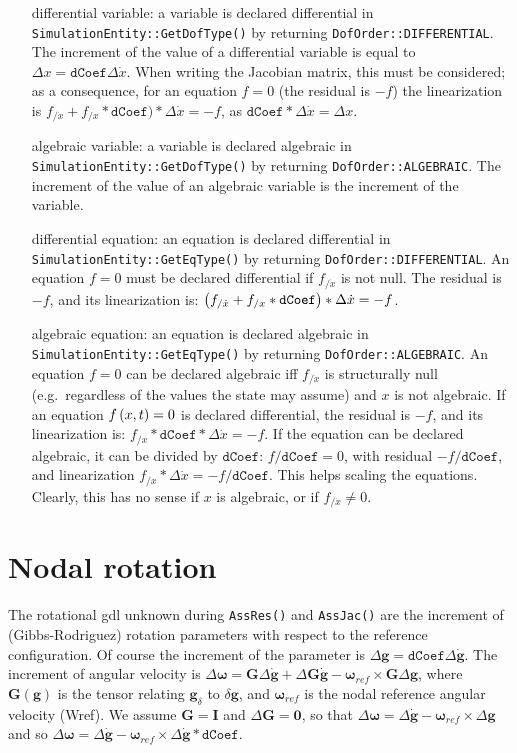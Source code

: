 \documentclass[10pt,dvips,fleqn]{report}
\newcommand{\T}[1]{\boldsymbol{#1}}
\begin{document}
\begin{itemize}

\item[differential variable:] a variable is declared differential
in \texttt{SimulationEntity::GetDofType()} 
by returning \texttt{DofOrder::DIFFERENTIAL}.
The increment of the value of a differential variable is equal 
to $\Delta x=\texttt{dCoef}\Delta \dot{x}$.
When writing the Jacobian matrix, this must be considered;
as a consequence, for an equation $f=0$ (the residual is $-f$)
the linearization is 
$f_{/\dot{x}}+f_{/x}*\texttt{dCoef})*\Delta \dot{x}=-f$, 
as $\texttt{dCoef}*\Delta \dot{x}=\Delta x$.

\item[algebraic variable:] a variable is declared algebraic
in \texttt{SimulationEntity::GetDofType()}
by returning \texttt{DofOrder::ALGEBRAIC}.
The increment of the value of an algebraic variable is the increment 
of the variable.

\item[differential equation:] an equation is declared differential
in \texttt{SimulationEntity::GetEqType()}
by returning \texttt{DofOrder::DIFFERENTIAL}.
An equation $f=0$ must be declared differential if $f_{/\dot{x}}$ is not null.
The residual is $-f$, and its linearization is:
$\left( f_{/\dot{x}}+f_{/x}*\texttt{dCoef} \right)*\Delta \dot{x}=-f$.

\item[algebraic equation:] an equation is declared algebraic
in \texttt{SimulationEntity::GetEqType()}
by returning \texttt{DofOrder::ALGEBRAIC}.
An equation $f=0$ can be declared algebraic iff $f_{/\dot{x}}$ 
is structurally null (e.g.\ regardless of the values the state may assume) 
and $x$ is not algebraic.
If an equation $f\left( x,t \right)=0$ is declared differential,
the residual is $-f$, and its linearization is:
$f_{/x}*\texttt{dCoef}*\Delta \dot{x}=-f$.
If the equation can be declared algebraic, it can be divided by $\texttt{dCoef}$:
$f/\texttt{dCoef}=0$, with residual $-f/\texttt{dCoef}$,
and linearization $f_{/x}*\Delta \dot{x} = -f/\texttt{dCoef}$.
This helps scaling the equations.
Clearly, this has no sense if $x$ is algebraic,
or if $f_{/\dot{x}} \neq 0$.

\end{itemize}

\section{Nodal rotation}
The rotational gdl unknown during \texttt{AssRes()} and \texttt{AssJac()}
are the increment of (Gibbs-Rodriguez) rotation parameters
with respect to the reference configuration.
Of course the increment of the parameter is
$\Delta \T g=\texttt{dCoef}\Delta \dot{\T g}$.
The increment of angular velocity is 
$\Delta \T \omega = \T G\Delta \dot{\T g}+ \Delta \T G \dot{\T g}-
\T \omega_{ref}\times \T G \Delta \T g$,
where $\T G(\T g)$ is the tensor relating $\T g_\delta$ to $\delta \T g$,
and $\T \omega_{ref}$ is the nodal reference angular velocity (Wref).
We assume $\T G = \T I$ and $\Delta \T G = \T 0$,
so that $\Delta \T \omega = \Delta \dot{\T g}-\T \omega_{ref}\times\Delta \T g$
and so $\Delta \T \omega = \Delta \dot{\T g}-
\T \omega_{ref}\times\Delta \dot{\T g} * \texttt{dCoef}$.
\end{document}
